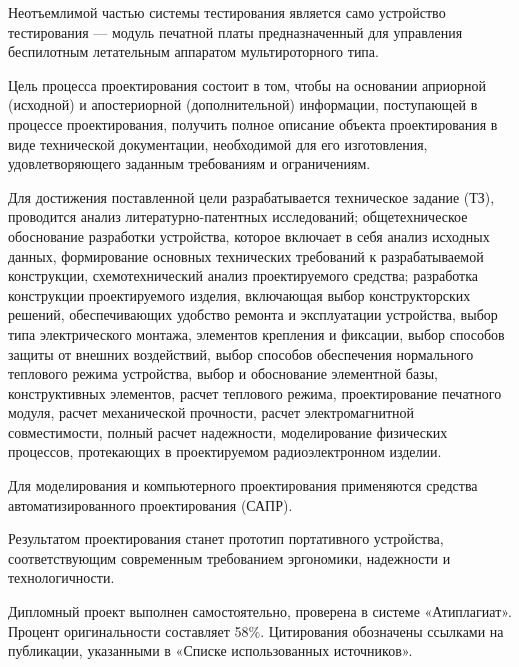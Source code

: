 Неотъемлимой частью системы тестирования является само устройство
тестирования — модуль печатной платы предназначенный для
управления беспилотным летательным аппаратом мультироторного типа.

Цель процесса проектирования состоит в том, чтобы на основании
априорной (исходной) и апостериорной (дополнительной) информации,
поступающей в процессе проектирования, получить полное описание
объекта проектирования в виде технической документации, необходимой
для его изготовления, удовлетворяющего заданным требованиям и
ограничениям.

Для достижения поставленной цели разрабатывается техническое задание
(ТЗ), проводится анализ литературно-патентных исследований;
общетехническое обоснование разработки устройства, которое включает в
себя анализ исходных данных, формирование основных технических
требований к разрабатываемой конструкции, схемотехнический анализ
проектируемого средства; разработка конструкции проектируемого
изделия, включающая выбор конструкторских решений, обеспечивающих
удобство ремонта и эксплуатации устройства, выбор типа электрического
монтажа, элементов крепления и фиксации, выбор способов защиты от
внешних воздействий, выбор способов обеспечения нормального теплового
режима устройства, выбор и обоснование элементной базы, конструктивных
элементов, расчет теплового режима, проектирование печатного модуля,
расчет механической прочности, расчет электромагнитной совместимости,
полный расчет надежности, моделирование физических процессов,
протекающих в проектируемом радиоэлектронном изделии.

Для моделирования и компьютерного проектирования применяются средства
автоматизированного проектирования (САПР).

Результатом проектирования станет прототип портативного устройства,
соответствующим современным требованием эргономики, надежности и
технологичности.

Дипломный проект выполнен самостоятельно, проверена в системе
«Атиплагиат».  Процент оригинальности составляет 58\%. Цитирования
обозначены ссылками на публикации, указанными в «Списке использованных
источников».

\newpage
